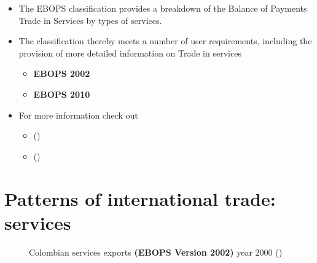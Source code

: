 \documentclass[
  ignorenonframetext,
]{beamer}
\providecommand{\tightlist}{%
  \setlength{\itemsep}{0pt}\setlength{\parskip}{0pt}}\usepackage{longtable,booktabs,array}
\begin{document}
\begin{frame}{}
\label{section-10}
\begin{itemize}
\item
  The EBOPS classification provides a breakdown of the Balance of
  Payments Trade in Services by types of services.
\item
  The classification thereby meets a number of user requirements,
  including the provision of more detailed information on Trade in
  services

  \begin{itemize}
  \tightlist
  \item
    \textbf{EBOPS 2002}
  \item
    \textbf{EBOPS 2010}
  \end{itemize}
\item
  For more information check out

  \begin{itemize}
  \tightlist
  \item
    ()
  \item
    ()
  \end{itemize}
\end{itemize}
\end{frame}

\section{Patterns of international trade:
services}\label{patterns-of-international-trade-services}

\begin{frame}{}
\label{section-11}
\begin{figure}


\caption{\label{fig-colombian-services-exports-2000}Colombian services
exports \textbf{(EBOPS Version 2002)} year 2000
()}

\end{figure}%
\end{frame}
\end{document}
